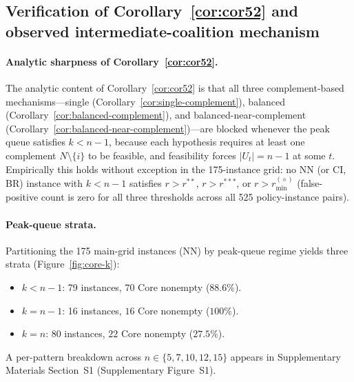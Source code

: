 \documentclass[11pt]{article}
\theoremstyle{plain}
\theoremstyle{definition}
\theoremstyle{remark}
\begin{document}
\subsection{Verification of Corollary~\ref{cor:cor52} and observed intermediate-coalition mechanism}
\label{ssec:cor16}

\paragraph{Analytic sharpness of Corollary~\ref{cor:cor52}.} The analytic content of Corollary~\ref{cor:cor52} is that all three complement-based mechanisms---single (Corollary~\ref{cor:single-complement}), balanced (Corollary~\ref{cor:balanced-complement}), and balanced-near-complement (Corollary~\ref{cor:balanced-near-complement})---are blocked whenever the peak queue satisfies $k<n-1$, because each hypothesis requires at least one complement $N\setminus\{i\}$ to be feasible, and feasibility forces $|U_t|=n-1$ at some $t$. Empirically this holds without exception in the 175-instance grid: no NN (or CI, BR) instance with $k<n-1$ satisfies $r>r^{\ast\ast}$, $r>r^{\ast\ast\ast}$, or $r>r^{(\diamond)}_{\min}$ (false-positive count is zero for all three thresholds across all 525 policy-instance pairs).

\paragraph{Peak-queue strata.} Partitioning the 175 main-grid instances (NN) by peak-queue regime yields three strata (Figure~\ref{fig:core-k}):
\begin{itemize}
  \item $k<n-1$: 79 instances, $70$ Core nonempty ($88.6\%$).
  \item $k=n-1$: 16 instances, $16$ Core nonempty ($100\%$).
  \item $k=n$:   80 instances, $22$ Core nonempty ($27.5\%$).
\end{itemize}
A per-pattern breakdown across $n\in\{5,7,10,12,15\}$ appears in Supplementary Materials Section~S1 (Supplementary Figure~S1).
\end{document}
